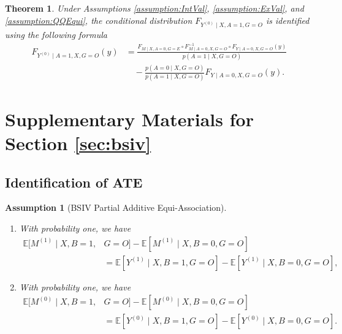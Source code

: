 \documentclass[10pt]{article}
\newtheorem{theorem}{Theorem}
\newtheorem{assumption}{Assumption}
\newcommand{\E}{\mathbb{E}}
\begin{document}
\begin{theorem}
\label{thm:equiETTQQ}
Under Assumptions \ref{assumption:IntVal}, \ref{assumption:ExVal}, and \ref{assumption:QQEqui}, the conditional distribution $F_{Y^{(0)}\mid X,A=1,G=O}$ is identified using the following formula
\begin{align*}
F_{Y^{(0)}\mid A=1,X,G=O}(y)
&=\frac{F_{M\mid X,A=0,G=E}\circ F^{-1}_{M\mid A=0,X,G=O} \circ F_{Y\mid A=0,X,G=O}(y)}{p(A=1\mid X,G=O)}\\
&\quad-\frac{p(A=0\mid X,G=O)}{p(A=1\mid X,G=O)} F_{Y\mid A=0,X,G=O}(y).
\end{align*}
\end{theorem}


\section{Supplementary Materials for Section \ref{sec:bsiv}}
\label{sec:bsiv::supp}


\subsection{Identification of ATE}


\begin{assumption}[BSIV Partial Additive Equi-Association]
\label{assumption:BSEqui::supp}
~
\begin{enumerate}[label=(\roman*)]
\item With probability one, we have
\begin{align*}
\E[M^{(1)}\mid  X,B=1,&G=O]-\E[M^{(1)}\mid  X,B=0,G=O]\\
&=\E[Y^{(1)}\mid  X,B=1,G=O]-\E[Y^{(1)}\mid  X,B=0,G=O],
\end{align*}
\item With probability one, we have
\begin{align*}
\E[M^{(0)}\mid X,B=1,&G=O]-\E[M^{(0)}\mid  X,B=0,G=O]\\
&=\E[Y^{(0)}\mid  X,B=1,G=O]-\E[Y^{(0)}\mid  X,B=0,G=O].
\end{align*}	
\end{enumerate}
\end{assumption}
\end{document}
